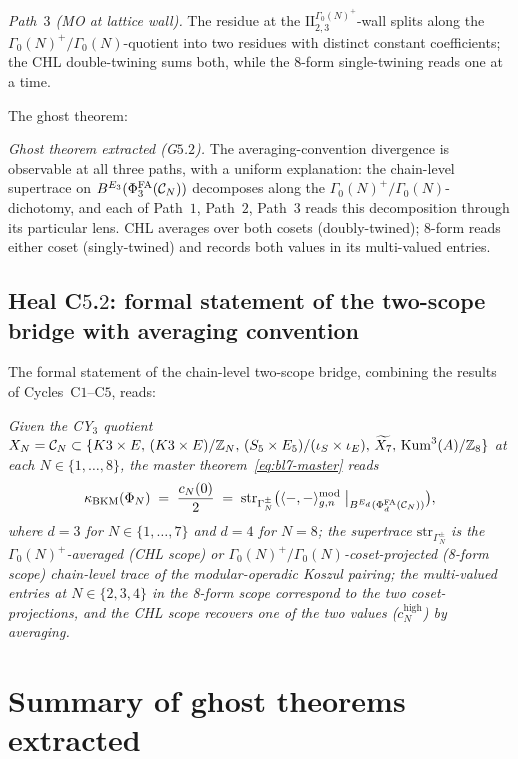 \emph{Path~$3$ (MO at lattice wall).} The residue at the
$\mathrm{II}_{2, 3}^{\Gamma_0(N)^+}$-wall splits along the
$\Gamma_0(N)^+ / \Gamma_0(N)$-quotient into two residues with distinct
constant coefficients; the CHL double-twining sums both, while the
8-form single-twining reads one at a time.

The ghost theorem:

\emph{Ghost theorem extracted (G$5$.$2$).} The averaging-convention
divergence is observable at all three paths, with a uniform
explanation: the chain-level supertrace on $B^{E_{3}}(\Phi^{\mathrm{FA}}_{3}(\mathcal{C}_N))$
decomposes along the $\Gamma_0(N)^+ / \Gamma_0(N)$-dichotomy, and each
of Path~$1$, Path~$2$, Path~$3$ reads this decomposition through its
particular lens. CHL averages over both cosets (doubly-twined);
8-form reads either coset (singly-twined) and records both values in
its multi-valued entries.

\subsection*{Heal C$5$.$2$: formal statement of the two-scope bridge
with averaging convention}

The formal statement of the chain-level two-scope bridge, combining the
results of Cycles~C$1$--C$5$, reads:

\emph{Given the CY$_3$ quotient $X_N = \mathcal{C}_N \subset \{K3 \times E,
\, (K3 \times E) / \mathbb{Z}_N, \, (S_5 \times E_5) / (\iota_S \times
\iota_E), \, \widetilde{X_7}, \, \mathrm{Kum}^3(A) / \mathbb{Z}_8\}$ at
each $N \in \{1, \dots, 8\}$, the master theorem~\eqref{eq:bl7-master}
reads}
\[
 \kappa_{\mathrm{BKM}}(\Phi_N) \;=\; \frac{c_N(0)}{2} \;=\;
    \mathrm{str}_{\Gamma_N^\pm}
      \bigl(
         \langle -, - \rangle^{\mathrm{mod}}_{g, n}
         \bigm|_{B^{E_{d}}(\Phi^{\mathrm{FA}}_d(\mathcal{C}_N))}
      \bigr),
\]
\emph{where $d = 3$ for $N \in \{1, \dots, 7\}$ and $d = 4$ for $N = 8$;
the supertrace $\mathrm{str}_{\Gamma_N^\pm}$ is the
$\Gamma_0(N)^+$-averaged (CHL scope) or
$\Gamma_0(N)^+ / \Gamma_0(N)$-coset-projected (8-form scope) chain-level
trace of the modular-operadic Koszul pairing; the multi-valued entries
at $N \in \{2, 3, 4\}$ in the 8-form scope correspond to the two
coset-projections, and the CHL scope recovers one of the two values
($c_N^{\mathrm{high}}$) by averaging.}

\section{Summary of ghost theorems extracted}
\label{sec:bl8-ghosts-summary}


